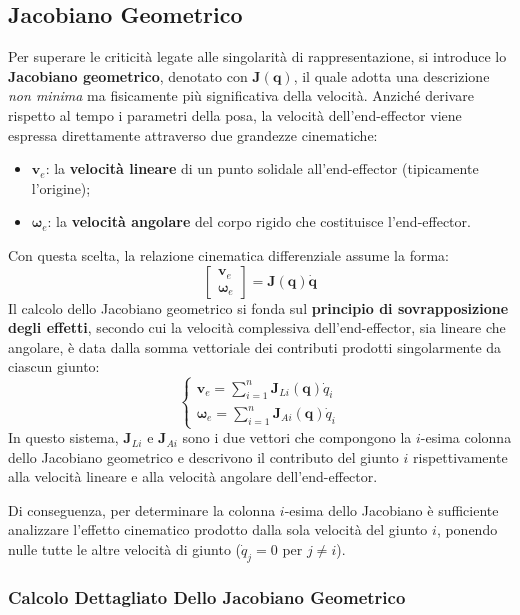 \documentclass[11pt, a4paper]{report}
\begin{document}
\subsection{Jacobiano Geometrico}
Per superare le criticità legate alle singolarità di rappresentazione, si introduce lo \textbf{Jacobiano geometrico}, denotato con \(\bm{J}(\bm{q})\), il quale adotta una descrizione \textit{non minima} ma fisicamente più significativa della velocità. Anziché derivare rispetto al tempo i parametri della posa, la velocità dell'end-effector viene espressa direttamente attraverso due grandezze cinematiche:
\begin{itemize}
    \item \(\bm{v}_e\): la \textbf{velocità lineare} di un punto solidale all'end-effector (tipicamente l'origine);
    \item \(\bm{\omega}_e\): la \textbf{velocità angolare} del corpo rigido che costituisce l'end-effector.
\end{itemize}
Con questa scelta, la relazione cinematica differenziale assume la forma:
\[
    \begin{bmatrix}
        \bm{v}_e \\
        \bm{\omega}_e
    \end{bmatrix}
    =
    \bm{J}(\bm{q})\dot{\bm{q}}
\]
Il calcolo dello Jacobiano geometrico si fonda sul \textbf{principio di sovrapposizione degli effetti}, secondo cui la velocità complessiva dell'end-effector, sia lineare che angolare, è data dalla somma vettoriale dei contributi prodotti singolarmente da ciascun giunto:
\[
    \begin{cases}
        \displaystyle{\bm{v}_e = \sum_{i=1}^n \bm{J}_{Li}(\bm{q})\dot{q}_i} \\
        \displaystyle{\bm{\omega}_e = \sum_{i=1}^n \bm{J}_{Ai}(\bm{q})\dot{q}_i}
    \end{cases}
\]
In questo sistema, \(\bm{J}_{Li}\) e \(\bm{J}_{Ai}\) sono i due vettori che compongono la \(i\)-esima colonna dello Jacobiano geometrico e descrivono il contributo del giunto \(i\) rispettivamente alla velocità lineare e alla velocità angolare dell'end-effector.

Di conseguenza, per determinare la colonna \(i\)-esima dello Jacobiano è sufficiente analizzare l'effetto cinematico prodotto dalla sola velocità del giunto \(i\), ponendo nulle tutte le altre velocità di giunto (\(\dot{q}_j = 0\) per \(j \neq i\)).
\newpage

\subsubsection{Calcolo Dettagliato Dello Jacobiano Geometrico}
\end{document}
